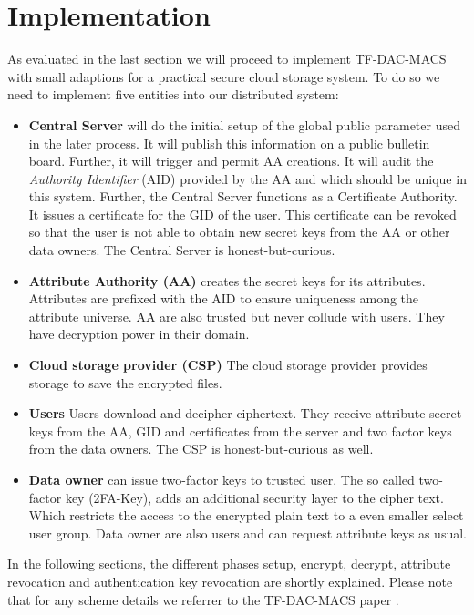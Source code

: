 \section{Implementation}
As evaluated in the last section we will proceed to implement TF-DAC-MACS with small adaptions for a practical secure cloud storage system. To do so we need to implement five entities into our distributed system:  

\begin{itemize}
  \item \textbf{Central Server} will do the initial setup of the global public parameter used in the later process. It will publish this information on a public bulletin board. Further, it will trigger and permit AA creations. It will audit the \textit{Authority Identifier} (\ac{AID}) provided by the AA and which should be unique in this system. 
Further, the Central Server functions as a Certificate Authority. It issues a certificate for the GID of the user. This certificate can be revoked so that the user is not able to obtain new secret keys from the AA or other data owners. The Central Server is honest-but-curious.
  \item \textbf{Attribute Authority (\ac{AA})} creates the secret keys for its attributes. Attributes are prefixed with the \ac{AID} to ensure uniqueness among the attribute universe. AA are also trusted but never collude with users. They have decryption power in their domain. 
  \item \textbf{Cloud storage provider (\ac{CSP})} The cloud storage provider provides storage to save the encrypted files.
  \item \textbf{Users} Users download and decipher ciphertext. They receive attribute secret keys from the AA, GID and certificates from the server and two factor keys from the data owners. The CSP is honest-but-curious as well.
  \item \textbf{Data owner} can issue two-factor keys to trusted user. The so called two-factor key (\ac{2FA}-Key), adds an additional security layer to the cipher text. Which restricts the access to the encrypted plain text to a even smaller select user group. Data owner are also users and can request attribute keys as usual. 
\end{itemize}

In the following sections, the different phases setup, encrypt, decrypt, attribute revocation and authentication key revocation are shortly explained. Please note that for any scheme details we referrer to the TF-DAC-MACS \cite{li2017two} paper .

